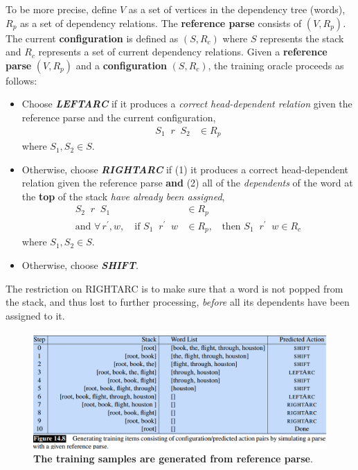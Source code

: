 \documentclass[11pt]{article}
\begin{document}
To be more precise, define $V$ as a set of vertices in the dependency tree (words), $R_{p}$ as a set of dependency relations. The \textbf{reference parse} consists of $(V, R_{p})$. The current \textbf{configuration} is defined as $(S, R_{c})$ where $S$ represents the stack and $R_{c}$ represents a set of current dependency relations.  Given a \textbf{reference parse} $(V, R_{p})$ and a \textbf{configuration} $(S, R_{c})$, the training oracle proceeds as follows:
\begin{itemize}
\item Choose \emph{\textbf{LEFTARC}} if it produces a \emph{correct head-dependent relation} given the reference parse and the current configuration, 
\begin{align*}
S_1\;\;r \;\; S_2 & \in R_{p}
\end{align*} where $S_1, S_2 \in S$.
\item  Otherwise, choose \textit{\textbf{RIGHTARC}} if (1) it produces a correct head-dependent relation given the reference parse \textbf{and} (2) all of the \emph{dependents} of the word at the \textbf{top} of the stack \emph{have already been assigned},
\begin{align*}
S_2\;\;r \;\; S_1 & \in R_{p} \;\; \\
\text{and }\forall\,r^{'},w,\quad \text{if }S_1\;\;r^{'} \;\; w & \in R_{p},\;\;\text{ then }S_1\;\;r^{'} \;\; w \in R_{c}
\end{align*} where $S_1, S_2 \in S$.
\item Otherwise, choose \emph{\textbf{SHIFT}}.
\end{itemize} The restriction on RIGHTARC is to make sure that a word is not popped from the stack, and thus lost to further processing, \emph{before} all its
dependents have been assigned to it.

\begin{figure}
\begin{minipage}[t]{1\linewidth}
  \centering
  \centerline{\includegraphics[scale = 0.4]{dep_parse_training_sample.png}}
\end{minipage}
\caption{\footnotesize{\textbf{The training samples are generated from reference parse}.}}
\label{fig: dep_parse_training_sample}
\end{figure}
\end{document}
